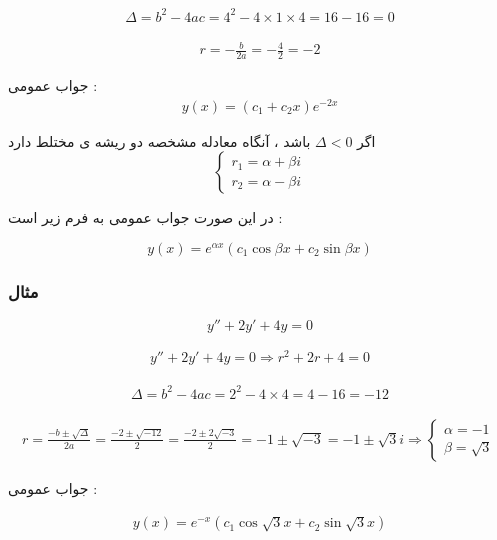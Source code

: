 \documentclass[12pt]{book}
\begin{document}
\begin{align*}
\Delta = b^{2} - 4ac = 4^{2} - 4 \times 1 \times 4 = 16 - 16 = 0
\end{align*}

\begin{align*}
r = - \frac{b}{2a} = - \frac{4}{2} = - 2
\end{align*}

جواب عمومی : 
\begin{align*}
y(x) = ( c_{1} + c_{2}x ) e^{-2x}
\end{align*}



\begin{tcolorbox}
اگر 
$\Delta < 0$
باشد ، آنگاه معادله مشخصه دو ریشه ی مختلط دارد
$$
\begin{cases}
r_{1} = \alpha + \beta i \\
r_{2} = \alpha - \beta i
\end{cases}
$$

در این صورت جواب عمومی به فرم زیر است :

$$
y(x) = e^{\alpha x} ( c_{1} \cos{\beta x} + c_{2} \sin{\beta x} )
$$

\end{tcolorbox}


\subsubsection{مثال}

$$
y'' + 2y' + 4y = 0
$$

\begin{align*}
y'' + 2y' + 4y = 0 \Rightarrow r^{2} + 2r + 4 = 0
\end{align*}

\begin{align*}
\Delta = b^{2} - 4ac = 2^{2} - 4 \times 4 = 4 - 16 = -12
\end{align*}

\begin{align*}
r = \frac{-b \pm \sqrt{\Delta}}{2a} = \frac{-2 \pm \sqrt{-12}}{2} = \frac{-2 \pm 2 \sqrt{-3}}{2} = -1 \pm \sqrt{-3} = -1 \pm \sqrt{3} i \Rightarrow
\begin{cases}
\alpha = -1 \\
\beta = \sqrt{3}
\end{cases}
\end{align*}

جواب عمومی :

\begin{align*}
y(x) = e^{-x} ( c_{1}\cos{\sqrt{3}x} + c_{2}\sin{\sqrt{3}x} )
\end{align*}
\end{document}
